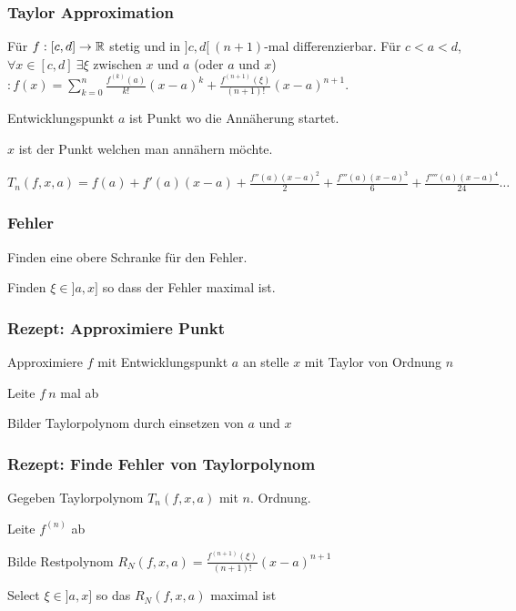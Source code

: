 \subsubsection{Taylor Approximation}
Für $f:[c,d] \to \mathbb{R}$ stetig und in $]c, d[ \ (n+1)$-mal differenzierbar. Für $c < a < d$, $\forall x \in [c, d] \ \exists \xi$ zwischen $x$ und $a$ (oder $a$ und $x$)$: f(x) = \sum_{k=0}^{n} \frac{f^{(k)}(a)}{k!}(x-a)^k + \frac{f^{(n+1)}(\xi)}{(n+1)!}(x-a)^{n+1}$.\\
\begin{compactitem}
    \item Entwicklungspunkt $a$ ist Punkt wo die Annäherung startet.
    \item $x$ ist der Punkt welchen man annähern möchte.
    \item $T_n(f, x, a) = f(a) + f'(a)(x - a) + \frac{f''(a)(x - a)^2}{2} + \frac{f'''(a)(x - a)^3}{6} + \frac{f''''(a)(x - a)^4}{24} \dots$
\end{compactitem}

\subsubsection{Fehler}
\begin{compactitem}
    \item Finden eine obere Schranke für den Fehler.
    \item Finden $\xi \in ]a, x]$ so dass der Fehler maximal ist.
\end{compactitem}

\subsubsection{Rezept: Approximiere Punkt}
Approximiere $f$ mit Entwicklungspunkt $a$ an stelle $x$ mit Taylor von Ordnung $n$
\begin{compactenum}
    \item Leite $f \ n$ mal ab
    \item Bilder Taylorpolynom durch einsetzen von $a$ und $x$
\end{compactenum}

\subsubsection{Rezept: Finde Fehler von Taylorpolynom}
Gegeben Taylorpolynom $T_n(f, x, a)$ mit $n$. Ordnung.
\begin{compactenum}
    \item Leite $f^{(n)}$ ab
\item Bilde Restpolynom $R_N(f, x, a) = \frac{f^{(n+1)}(\xi)}{(n + 1)!}(x - a)^{n + 1}$
    \item Select $\xi \in ]a, x]$ so das $R_N(f, x, a)$ maximal ist 
\end{compactenum}

